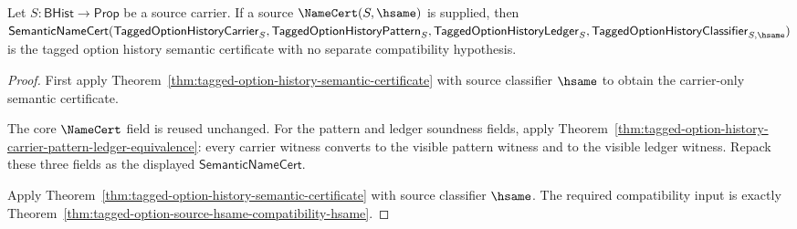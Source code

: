 \begin{corollary}
\label{cor:tagged-option-history-semantic-certificate-hsame}
Let $S:\mathsf{BHist}\to\mathsf{Prop}$ be a source carrier. If a source $\NameCert(S,\hsame)$ is supplied, then $\mathsf{SemanticNameCert}(\mathsf{TaggedOptionHistoryCarrier}_S,\mathsf{TaggedOptionHistoryPattern}_S,\mathsf{TaggedOptionHistoryLedger}_S,\mathsf{TaggedOptionHistoryClassifier}_{S,\hsame})$ is the tagged option history semantic certificate with no separate compatibility hypothesis.
\end{corollary}
\begin{proof}
First apply Theorem~\ref{thm:tagged-option-history-semantic-certificate} with source classifier $\hsame$ to obtain the carrier-only semantic certificate.

The core $\NameCert$ field is reused unchanged. For the pattern and ledger soundness fields, apply Theorem~\ref{thm:tagged-option-history-carrier-pattern-ledger-equivalence}: every carrier witness converts to the visible pattern witness and to the visible ledger witness. Repack these three fields as the displayed $\mathsf{SemanticNameCert}$.

Apply Theorem~\ref{thm:tagged-option-history-semantic-certificate} with source classifier $\hsame$. The required compatibility input is exactly Theorem~\ref{thm:tagged-option-source-hsame-compatibility-hsame}.
\end{proof}

